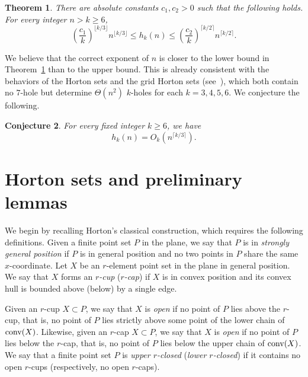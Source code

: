 \documentclass[11pt]{article}
\theoremstyle{plain}
\newtheorem{theorem}{Theorem}[section]
\newtheorem{conjecture}[theorem]{Conjecture}
\theoremstyle{definition}
\theoremstyle{remark}
\def\conv{\mbox{\rm conv}}
\begin{document}
\begin{theorem}\label{hole1}
There are absolute constants $c_1,c_2>0$ such that the following holds. For every integer \(n>k\ge 6\),
\[
\left(\frac{c_1}{k}\right)^{\lfloor k/3\rfloor} n^{\lfloor k/3\rfloor}
\le h_k(n)\le
\left(\frac{c_2}{k}\right)^{\lceil k/2\rceil} n^{\lceil k/2\rceil}.
\]
\end{theorem}

 

\medskip

We believe that the correct exponent of $n$ is closer to the lower bound in
Theorem~\ref{hole1} than to the upper bound.  This is already consistent with
the behaviors of the Horton sets and the grid Horton sets (see~\cite{BV}), which both contain no \(7\)-hole but determine
\(\Theta(n^2)\) \(k\)-holes for each \(k=3,4,5,6\).  We conjecture the
following.


\begin{conjecture}
For every fixed integer $k\ge 6$, we have
\[
h_k(n)=O_k\!\left(n^{\lceil k/3 \rceil}\right).
\]
\end{conjecture}






 

\section{Horton sets and preliminary lemmas}

We begin by recalling Horton's classical construction, which requires the following definitions.
Given a finite point set $P$ in the plane, we say that $P$ is in \emph{strongly general position} if $P$ is in general position and no two points in $P$ share the same $x$-coordinate.  Let $X$ be an $r$-element point set in the plane in general position. We say that $X$
forms an \emph{$r$-cup} (\emph{$r$-cap}) if $X$ is in convex position and its convex hull is bounded above (below) by a single edge.  









Given an $r$-cup $X \subset P$, we say that $X$ is \emph{open} if no point of $P$ lies above the $r$-cup, that is, no point of $P$ lies strictly above some point of the lower chain of $\conv(X)$. Likewise, given an $r$-cap $X \subset P$, we say that $X$ is \emph{open} if no point of $P$ lies below the $r$-cap, that is, no point of $P$ lies below the upper chain of $\conv(X)$. We say that a finite point set $P$ is \emph{upper $r$-closed} (\emph{lower $r$-closed}) if it contains no open $r$-cups (respectively, no open $r$-caps).
\end{document}

